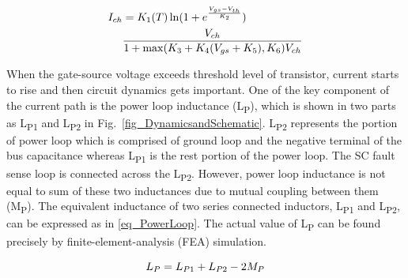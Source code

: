 \documentclass[journal]{IEEEtran}
\begin{document}
\begin{equation}
    \centering
    \begin{split}
             I_{ch} &   = K_1(T)\ln (1 + e^{\frac{V_{gs}-V_{th}}{K_2}})
             \\
           & \frac{V_{ch}}{1 + \max(K_3 + K_4(V_{gs} + K_5),K_6)V_{ch}}
        \end{split}
    \label{eq_transconductance}
\end{equation}


When the gate-source voltage exceeds threshold level of transistor, current starts to rise and then circuit dynamics gets important. One of the key component of the current path is the power loop inductance (L\textsubscript{P}), which is shown in two parts as L\textsubscript{P1} and L\textsubscript{P2} in Fig.~\ref{fig_DynamicsandSchematic}. L\textsubscript{P2} represents the portion of power loop which is comprised of ground loop and the negative terminal
of the bus capacitance whereas L\textsubscript{P1} is the rest portion of the power loop. The SC fault sense loop is connected across the L\textsubscript{P2}. However, power loop inductance is not equal to sum of these two inductances due to mutual coupling between them (M\textsubscript{P}). The equivalent inductance of two series connected inductors, L\textsubscript{P1} and L\textsubscript{P2}, can be expressed as in \eqref{eq_PowerLoop}. The actual value of L\textsubscript{P} can be found precisely by finite-element-analysis (FEA) simulation.

\begin{equation}
    \label{eq_PowerLoop}
    \centering
     L_P = L_{P1} + L_{P2} - 2M_{P}
\end{equation}
\end{document}

